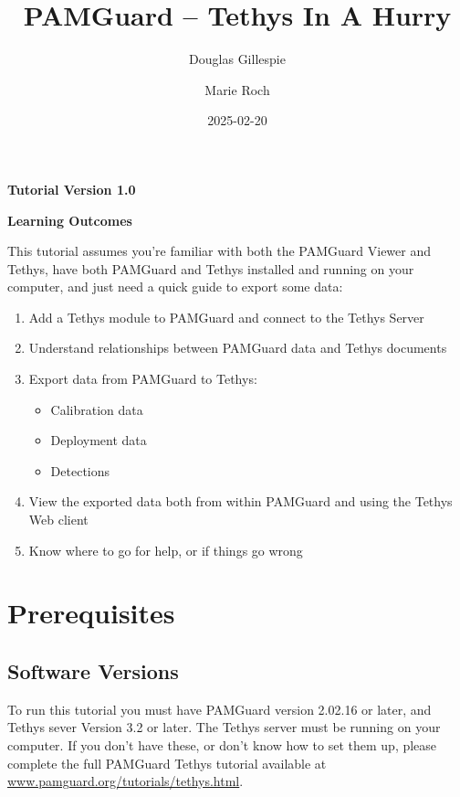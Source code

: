 \documentclass[
]{article}
\title{PAMGuard -- Tethys In A Hurry}
\author[1]{Douglas Gillespie}
\author[2]{Marie Roch}
\affil[1]{Sea Mammal Research Unit, University of St Andrews}
\affil[2]{Department of Computer Science, San Diego State University}
\date{2025-02-20}
\renewcommand*\contentsname{Table of contents}
\newcommand\contentsname{Table of contents}
\begin{document}
\maketitle

\centerline{\textbf{Tutorial Version 1.0}}
\vspace{3cm}

\centerline{\textbf{Learning Outcomes}}

This tutorial assumes you're familiar with both the PAMGuard Viewer and Tethys,
have both PAMGuard and Tethys installed and
running on your computer, and just need a quick guide to export some data:
\begin{enumerate}
\item Add a Tethys module to PAMGuard and connect to the Tethys Server
\item Understand relationships between PAMGuard data and Tethys documents
\item Export data from PAMGuard to Tethys:
\begin{itemize}
\item Calibration data
\item Deployment data
\item Detections
\end{itemize}
\item View the exported data both from within PAMGuard and using the Tethys Web client
\item Know where to go for help, or if things go wrong
\end{enumerate}
\newpage

\renewcommand*\contentsname{Table of contents}
{
\hypersetup{linkcolor=}
\setcounter{tocdepth}{3}
\tableofcontents
}
\listoffigures
\listoftables

\newpage{}

\pagestyle{plain}

\section{Prerequisites}\label{prerequisites}

\subsection{Software Versions}\label{software-versions}

To run this tutorial you must have PAMGuard version 2.02.16 or later,
and Tethys sever Version 3.2 or later. The Tethys server must be running
on your computer. If you don't have these, or don't know how to set them
up, please complete the full PAMGuard Tethys tutorial available at
\href{https://www.pamguard.org/tutorials/tethys.html}{www.pamguard.org/tutorials/tethys.html}.
\end{document}
